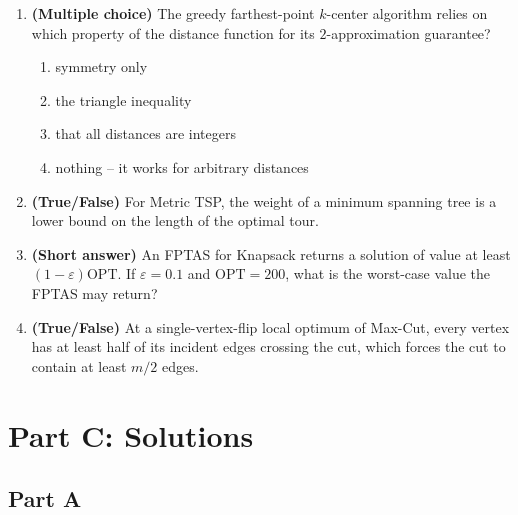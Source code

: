 \documentclass[11pt]{article}
\begin{document}
\begin{enumerate}[label=\textbf{B\arabic*.}, leftmargin=2.2em]
\item \textbf{(Multiple choice)} The greedy farthest-point $k$-center algorithm relies on
which property of the distance function for its $2$-approximation guarantee?
\begin{enumerate}[label=(\alph*)]
    \item symmetry only
    \item the triangle inequality
    \item that all distances are integers
    \item nothing -- it works for arbitrary distances
\end{enumerate}

\item \textbf{(True/False)} For Metric TSP, the weight of a minimum spanning tree is a
lower bound on the length of the optimal tour.

\item \textbf{(Short answer)} An FPTAS for Knapsack returns a solution of value at least
$(1-\varepsilon)\mathrm{OPT}$. If $\varepsilon = 0.1$ and $\mathrm{OPT} = 200$, what is the
worst-case value the FPTAS may return?

\item \textbf{(True/False)} At a single-vertex-flip local optimum of Max-Cut, every vertex
has at least half of its incident edges crossing the cut, which forces the cut to contain
at least $m/2$ edges.

\end{enumerate}

\newpage
\section*{Part C: Solutions}

\subsection*{Part A}
\end{document}
